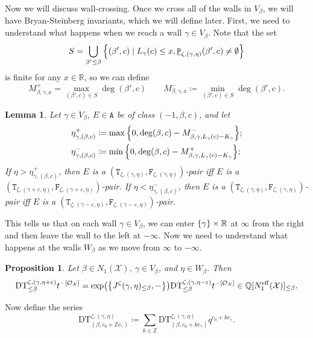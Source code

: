 \documentclass[leqno, openany]{memoir}
\newtheorem{prop}[thm]{Proposition}
\newtheorem{lem}[thm]{Lemma}
\theoremstyle{definition}
\theoremstyle{remark}
\theoremstyle{plain}
\theoremstyle{definition}
\theoremstyle{remark}
\newcommand{\R}{\mathbb{R}}
\newcommand{\Z}{\mathbb{Z}}
\newcommand{\Q}{\mathbb{Q}}
\newcommand{\ep}{\varepsilon}
\newcommand{\mc}[1]{\mathcal{#1}}
\newcommand{\mr}[1]{\mathrm{#1}}
\newcommand{\mt}[1]{\mathtt{#1}}
\newcommand{\ul}[1]{\underline{#1}}
\begin{document}
Now we will discuss wall-crossing. Once we cross all of the walls in $V_{\beta}$, we will have Bryan-Steinberg invariants, which we will define later. First, we need to understand what happens when we reach a wall $\gamma \in V_{\beta}$. Note that the set 
\[ S = \bigcup_{\beta' \leq \beta} \qty{(\beta', c) \mid L_{\gamma}(c) \leq x, \mt{\ul{P}}_{\zeta, (\gamma,\eta)}(\beta',c) \neq \emptyset} \]
is finite for any $x \in \R$, so we can define
\[ M_{\beta,\gamma,x}^+ = \max_{(\beta',c) \in S} \deg(\beta',c) \qquad M_{\beta, \gamma,x}^- \coloneqq \min_{(\beta',c) \in S} \deg(\beta', c). \]

\begin{lem}
    Let $\gamma \in V_{\beta}$, $E \in \mt{A}$ be of class $(-1, \beta, c)$, and let
    \begin{align*}
        \eta_{\gamma, (\beta,c)}^+ &\coloneqq \max \qty{0, \deg(\beta, c) - M^-_{\beta, \gamma,L_{\gamma}(c) - K_{\gamma}}}; \\
        \eta_{\gamma, (\beta,c)}^- &\coloneqq \min \qty{0, \deg(\beta, c) - M^+_{\beta, \gamma,L_{\gamma}(c) - K_{\gamma}}};
    \end{align*}
    If $\eta > \eta^+_{\gamma, (\beta, c)}$, then $E$ is a $(\mt{T}_{\zeta, (\gamma, \eta)}, \mt{F}_{\zeta, (\gamma,\eta)})$-pair iff $E$ is a $(\mt{T}_{\zeta, (\gamma+\ep, \eta)}, \mt{F}_{\zeta, (\gamma + \ep,\eta)})$-pair. If $\eta < \eta^-_{\gamma, (\beta, c)}$, then $E$ is a $(\mt{T}_{\zeta, (\gamma, \eta)}, \mt{F}_{\zeta, (\gamma,\eta)})$-pair iff $E$ is a $(\mt{T}_{\zeta, (\gamma-\ep, \eta)}, \mt{F}_{\zeta, (\gamma - \ep,\eta)})$-pair.
\end{lem}

This tells us that on each wall $\gamma \in V_{\beta}$, we can enter $\qty{\gamma} \times \R$ at $\infty$ from the right and then leave the wall to the left at $-\infty$. Now we need to understand what happens at the walls $W_{\beta}$ as we move from $\infty$ to $-\infty$.

\begin{prop}
    Let $\beta \in N_1(\mc{X})$, $\gamma \in V_{\beta}$, and $\eta \in W_{\beta}$. Then
    \[ \mr{DT}_{\leq \beta}^{\zeta, (\gamma, \eta + \ep)} t^{-[\mc{O}_{\mc{X}}]} = \exp(\qty{J^{\zeta}(\gamma,\eta)_{\leq \beta}, -}) \mr{DT}_{\leq \beta}^{\zeta, (\gamma, \eta-\ep)} t^{-[\mc{O}_{\mc{X}}]} \in \Q[N_1^{\mr{eff}}(\mc{X})]_{\leq \beta}. \]
\end{prop}

Now define the series
\[ \mr{DT}_{(\beta, c_0 + \Z c_{\gamma})}^{\zeta, (\gamma, \eta)} \coloneqq \sum_{k \in \Z} \mr{DT}_{(\beta, c_0 + kc_{\gamma})}^{\zeta, (\gamma,\eta)} q^{c_0 + kc_{\gamma}}. \]
\end{document}
